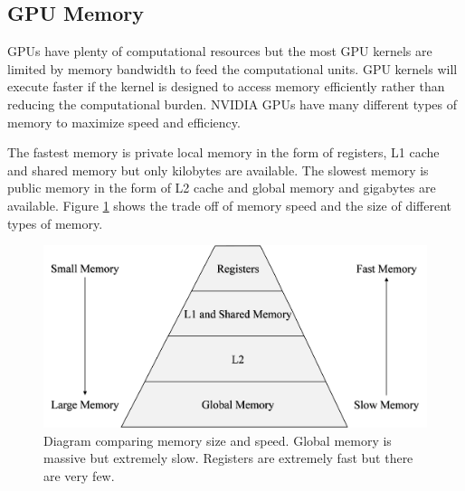 \subsection{GPU Memory}
\label{sec:GPU_memory}
GPUs have plenty of computational resources but the most GPU kernels are limited by memory bandwidth to feed the computational units.
GPU kernels will execute faster if the kernel is designed to access memory efficiently rather than reducing the computational burden.
NVIDIA GPUs have many different types of memory to maximize speed and efficiency.

The fastest memory is private local memory in the form of registers, L1 cache and shared memory but only kilobytes are available.
The slowest memory is public memory in the form of L2 cache and global memory and gigabytes are available.
Figure \ref{fig:MemoryPyramid} shows the trade off of memory speed and the size of different types of memory.
\begin{figure}
	\centering\includegraphics[width=8.36in/100*55]{figures/gpu_intro/MemoryPyramid.pdf}
	\caption{Diagram comparing memory size and speed. Global memory is massive but extremely slow. Registers are extremely fast but there are very few.}
	\label{fig:MemoryPyramid}
\end{figure}


